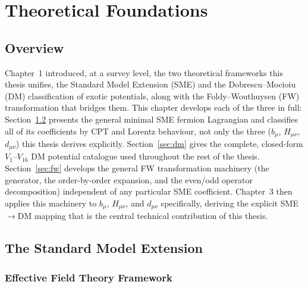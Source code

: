 \documentclass[main]{subfiles}
\begin{document}
\ifSubfilesClassLoaded{\setcounter{chapter}{1}}{}
\chapter{Theoretical Foundations}

\section{Overview}

Chapter~1 introduced, at a survey level, the two theoretical frameworks this
thesis unifies, the Standard Model Extension (SME) and the
Dobrescu--Mocioiu (DM) classification of exotic potentials, along with the
Foldy--Wouthuysen (FW) transformation that bridges them. This chapter
develops each of the three in full: Section~\ref{sec:sme} presents the
general minimal SME fermion Lagrangian and classifies all of its
coefficients by CPT and Lorentz behaviour, not only the three ($b_\mu$,
$H_{\mu\nu}$, $d_{\mu\nu}$) this thesis derives explicitly. Section~\ref{sec:dm}
gives the complete, closed-form $V_1$--$V_{16}$ DM potential catalogue used
throughout the rest of the thesis. Section~\ref{sec:fw} develops the general
FW transformation machinery (the generator, the order-by-order expansion,
and the even/odd operator decomposition) independent of any particular SME
coefficient. Chapter~3 then applies this machinery to $b_\mu$, $H_{\mu\nu}$,
and $d_{\mu\nu}$ specifically, deriving the explicit SME$\to$DM mapping that
is the central technical contribution of this thesis.

\section{The Standard Model Extension}
\label{sec:sme}

\subsection{Effective Field Theory Framework}
\end{document}
